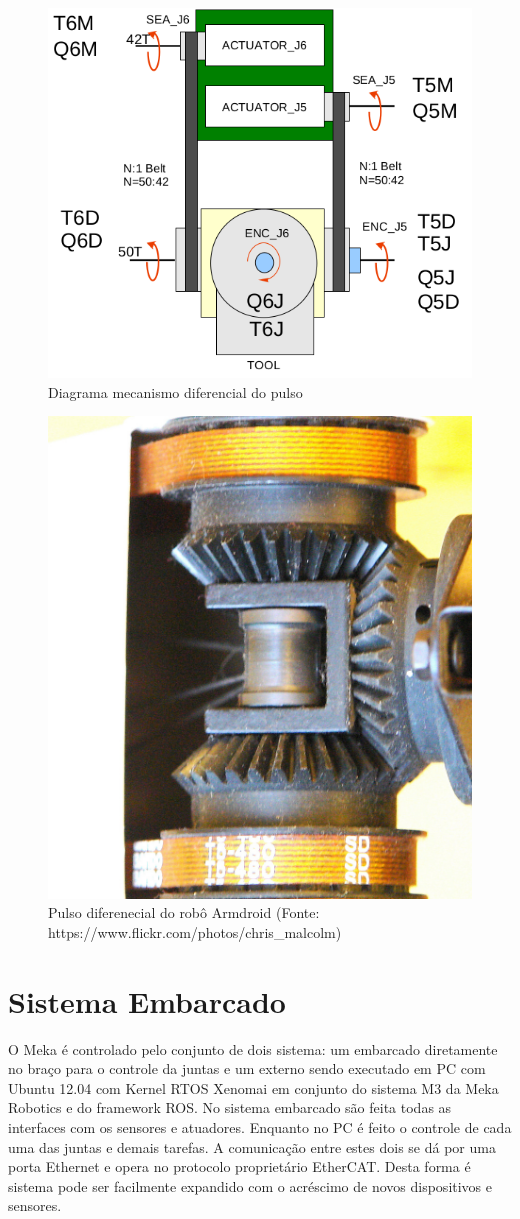 \begin{figure}[H]
    \centering
    \includegraphics[width = 0.6\linewidth]{tex/figs/meka_wrist.png}
    \caption{Diagrama mecanismo diferencial do pulso \cite{mekartfd}}
    \label{fig:meka-wrist}
\end{figure}

\begin{figure}[H]
    \centering
    \includegraphics[width = 0.6\linewidth]{tex/figs/armdroid_diff_wrist.jpg}
    \caption{Pulso diferenecial do robô Armdroid (Fonte: https://www.flickr.com/photos/chris_malcolm)}
    \label{fig:armdroid-wrist}
\end{figure}

\section{Sistema Embarcado}

O Meka é controlado pelo conjunto de dois sistema: um embarcado diretamente no braço para o controle da juntas e um externo sendo executado em PC com Ubuntu 12.04 com Kernel RTOS Xenomai em conjunto do sistema M3 da Meka Robotics e do framework ROS. No sistema embarcado são feita todas as interfaces com os sensores e atuadores. Enquanto no PC é feito o controle de cada uma das juntas e demais tarefas. A comunicação entre estes dois se dá por uma porta Ethernet e opera no protocolo proprietário EtherCAT. Desta forma é sistema pode ser facilmente expandido com o acréscimo de novos dispositivos e sensores.

